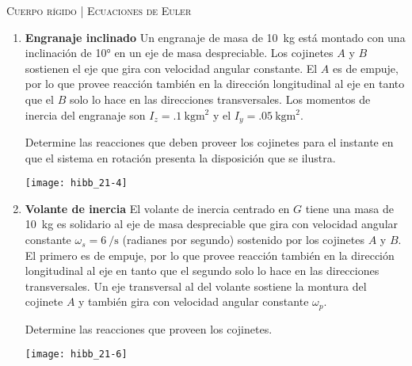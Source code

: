 \documentclass[11pt, spanish, a4paper, twoside]{article}
\begin{document}
\begin{center}
  \textsc{\large Cuerpo rígido | Ecuaciones de Euler}
\end{center}


\begin{enumerate}

	\item 
	\begin{minipage}[t][5cm]{0.55\textwidth}
		\textbf{Engranaje inclinado}
		Un engranaje de masa de \SI{10}{\kilo\gram} está montado con una inclinación de \ang{10;;} en un eje de masa despreciable.
		Los cojinetes \(A\) y \(B\) sostienen el eje que gira con velocidad angular constante.
		El \(A\) es de empuje, por lo que provee reacción también en la dirección longitudinal al eje en tanto que el \(B\) solo lo hace en las direcciones transversales.
		Los momentos de inercia del engranaje son \(I_z = \SI{.1}{\kilo\gram\metre\squared}\) y el \(I_y = \SI{.05}{\kilo\gram\metre\squared}\).
		\begin{tasks} 
			\task Determine las reacciones que deben proveer los cojinetes para el instante en que el sistema en rotación presenta la disposición que se ilustra.
		\end{tasks}
	\end{minipage}
	\begin{minipage}[c][0.5cm][t]{0.4\textwidth}
		\texttt{[image: hibb\_21-4]}
	\end{minipage}


	\item 
	\begin{minipage}[t][4.6cm]{0.55\textwidth}
		\textbf{Volante de inercia}
		El volante de inercia centrado en \(G\) tiene una masa de \SI{10}{\kilo\gram} es solidario al eje de masa despreciable que gira con velocidad angular constante \(\omega_s= \SI{6}{\per\second} \) (radianes por segundo) sostenido por los cojinetes \(A\) y \(B\).
		El primero es de empuje, por lo que provee reacción también en la dirección longitudinal al eje en tanto que el segundo solo lo hace en las direcciones transversales.
		Un eje transversal al del volante sostiene la montura del cojinete \(A\) y también gira con velocidad angular constante \(\omega_p\).
		\begin{tasks}
			\task Determine las reacciones que proveen los cojinetes.
		\end{tasks}
	\end{minipage}
	\begin{minipage}[c][0.5cm][t]{0.4\textwidth}
		\texttt{[image: hibb\_21-6]}
	\end{minipage}





\end{enumerate}
\end{document}
